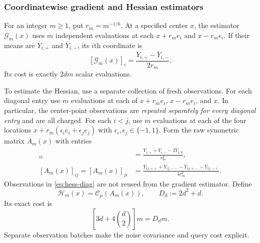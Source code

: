 \documentclass[11pt,a4paper]{article}
\newcommand{\clip}{\mathcal C_\mu}
\theoremstyle{definition}
\theoremstyle{remark}
\begin{document}
\subsubsection{Coordinatewise gradient and Hessian estimators}
For an integer $m\ge1$, put $r_m=m^{-1/6}$. At a specified center $x$, the estimator $\mathcal G_m(x)$ uses $m$ independent evaluations at each $x+r_me_i$ and $x-r_me_i$. If their means are $\overline Y_{i,+}$ and $\overline Y_{i,-}$, its $i$th coordinate is
\begin{equation}\label{eq:pilot-gradient}
 [\mathcal G_m(x)]_i=\frac{\overline Y_{i,+}-\overline Y_{i,-}}{2r_m}.
\end{equation}
Its cost is exactly $2dm$ scalar evaluations.

To estimate the Hessian, use a separate collection of fresh observations. For each diagonal entry use $m$ evaluations at each of $x+r_me_i$, $x-r_me_i$, and $x$. In particular, the center-point observations are \emph{repeated separately for every diagonal entry} and are all charged. For each $i<j$, use $m$ evaluations at each of the four locations $x+r_m(\epsilon_i e_i+\epsilon_j e_j)$ with $\epsilon_i,\epsilon_j\in\{-1,1\}$. Form the raw symmetric matrix $A_m(x)$ with entries
\begin{align}
 [A_m(x)]_{ii}
 &=\frac{\overline Y_{i,+}+\overline Y_{i,-}-2\overline Y_{i,0}}{r_m^2},\label{eq:hess-diag}\\
 [A_m(x)]_{ij}=[A_m(x)]_{ji}
 &=\frac{\overline Y_{ij,++}+\overline Y_{ij,--}
 -\overline Y_{ij,+-}-\overline Y_{ij,-+}}{4r_m^2}.
 \label{eq:hess-offdiag}
\end{align}
Observations in \eqref{eq:hess-diag} are not reused from the gradient estimator. Define
\begin{equation}\label{eq:pilot-hessian}
 \mathcal H_m(x)=\clip(A_m(x)),\qquad D_d:=2d^2+d.
\end{equation}
Its exact cost is
\begin{equation}\label{eq:hessian-cost}
 \left[3d+4\binom d2\right]m=D_dm.
\end{equation}
Separate observation batches make the noise covariance and query cost explicit.
\end{document}
